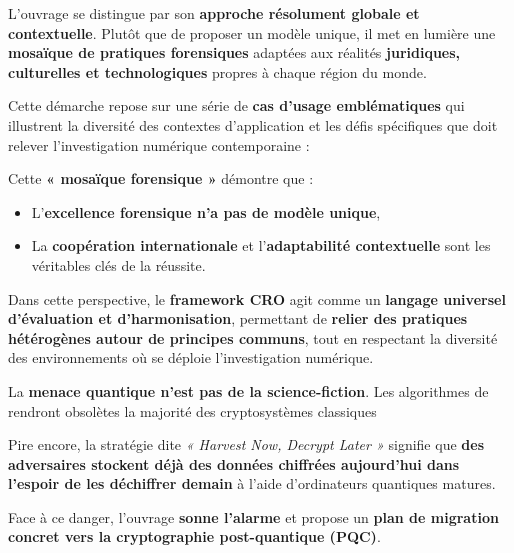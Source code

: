 \documentclass[11pt]{article}
\begin{document}
\onehalfspacing

L'ouvrage se distingue par son \textbf{approche résolument globale et contextuelle}. 
Plutôt que de proposer un modèle unique, il met en lumière une \textbf{mosaïque de pratiques forensiques} adaptées aux réalités 
\textbf{juridiques, culturelles et technologiques} propres à chaque région du monde.

\noindent Cette démarche repose sur une série de \textbf{cas d'usage emblématiques} qui illustrent la diversité des contextes d'application et les défis spécifiques que doit relever l’investigation numérique contemporaine :

\vspace{0.3cm}
    
\vspace{0.5cm}

\noindent Cette \textbf{« mosaïque forensique »} démontre que :
\begin{itemize}
    \item L’\textbf{excellence forensique n’a pas de modèle unique},
    \item La \textbf{coopération internationale} et l’\textbf{adaptabilité contextuelle} 
    sont les véritables clés de la réussite.
\end{itemize}

\vspace{0.3cm}

\noindent Dans cette perspective, le \textbf{framework CRO} agit comme un \textbf{langage universel d’évaluation et d’harmonisation}, 
permettant de \textbf{relier des pratiques hétérogènes autour de principes communs}, 
tout en respectant la diversité des environnements où se déploie l’investigation numérique.

\onehalfspacing

La \textbf{menace quantique n'est pas de la science-fiction}. 
Les algorithmes de  rendront obsolètes la majorité des cryptosystèmes classiques 

Pire encore, la stratégie dite \textit{« Harvest Now, Decrypt Later »} signifie que 
\textbf{des adversaires stockent déjà des données chiffrées aujourd’hui dans l’espoir de les déchiffrer demain} à l’aide d’ordinateurs quantiques matures.

\vspace{0.5cm}

\noindent Face à ce danger, l’ouvrage \textbf{sonne l’alarme} et propose un \textbf{plan de migration concret vers la cryptographie post-quantique (PQC)}.  
\end{document}
